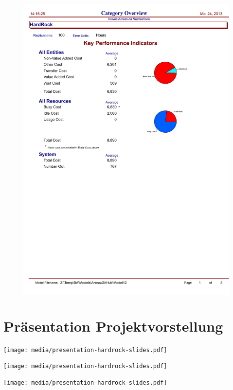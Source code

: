 \documentclass[ngerman,a4paper,12pt]{scrreprt}
\begin{document}
	\begin{figure}[H]
		\begin{center}
		\includegraphics[page=8, trim=0cm 0cm 0cm 0cm, clip=true, width=\textwidth]{../Auswertung/Raport 14-3-9/category overview.pdf}
		\end{center}
	\end{figure}
	

\chapter{Präsentation Projektvorstellung}
\begin{center}
	\texttt{[image: media/presentation-hardrock-slides.pdf]}
\end{center}
\begin{center}
	\texttt{[image: media/presentation-hardrock-slides.pdf]}
\end{center}
\begin{center}
	\texttt{[image: media/presentation-hardrock-slides.pdf]}
\end{center}
%
\end{document}
